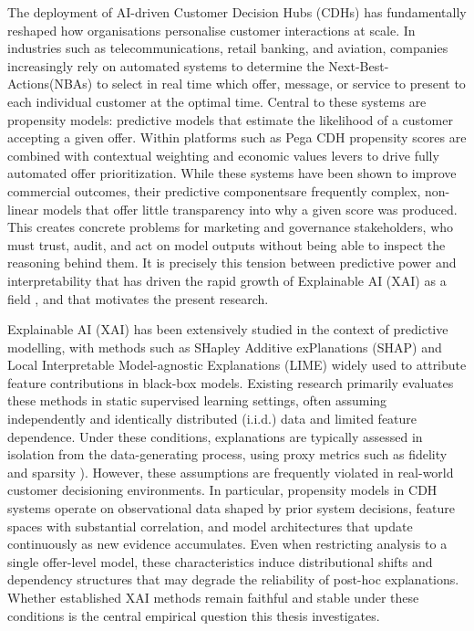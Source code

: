 \documentclass[oneside]{memoir} %
\begin{document}
The deployment of AI-driven Customer Decision Hubs (CDHs) has fundamentally reshaped how organisations personalise customer interactions at scale. In industries such as telecommunications, retail banking, and aviation, companies increasingly rely on automated systems to determine the Next-Best-Actions(NBAs) to select in real time which offer, message, or service to present to each individual customer at the optimal time. Central to these systems are propensity models: predictive models that estimate the likelihood of a customer accepting a given offer. Within platforms such as Pega CDH propensity scores are combined with contextual weighting and economic values levers to drive fully automated offer prioritization\parencite{pega_prioritizing_2025}. While these systems have been shown to improve commercial outcomes, their predictive componentsare frequently complex, non-linear models that offer little transparency into why a given score was produced. This creates concrete problems for marketing and governance stakeholders, who must trust, audit, and act on model outputs without being able to inspect the reasoning behind them. It is precisely this tension between predictive power and interpretability that has driven the rapid growth of Explainable AI (XAI) as a field \parencite{vilone_explainable_2020}, and that motivates the present research.

Explainable AI (XAI) has been extensively studied in the context of predictive modelling, with methods such as SHapley Additive exPlanations (SHAP) \parencite{lundberg_unified_2017} and Local Interpretable Model-agnostic Explanations (LIME) \parencite{ribeiro_why_2016} widely used to attribute feature contributions in black-box models. Existing research primarily evaluates these methods in static supervised learning settings, often assuming independently and identically distributed (i.i.d.) data and limited feature dependence\parencite{vilone_explainable_2020, molnar_interpretable_2025}. Under these conditions, explanations are typically assessed in isolation from the data-generating process, using proxy metrics such as fidelity and sparsity \parencite{}). However, these assumptions are frequently violated in real-world customer decisioning environments. In particular, propensity models in CDH systems operate on observational data shaped by prior system decisions, feature spaces with substantial correlation, and model architectures that update continuously as new evidence accumulates. Even when restricting analysis to a single offer-level model, these characteristics induce distributional shifts and dependency structures that may degrade the reliability of post-hoc explanations. Whether established XAI methods remain faithful and stable under these conditions is the central empirical question this thesis investigates.
\end{document}
